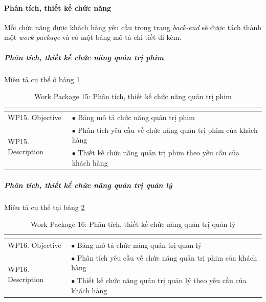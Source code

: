 \documentclass[a4paper]{book}
\begin{document}
\paragraph{Phân tích, thiết kế chức năng}
Mỗi chức năng được khách hàng yêu cầu trong trang \textit{back-end} sẽ được tách thành một \textit{work package} và có một bảng mô tả chi tiết đi kèm.
\subparagraph{Phân tích, thiết kế chức năng quản trị phim} Miêu tả cụ thể ở bảng \ref{table:backend_thietke_chucnang_phim}
\begin{table}[h!]
	\begin{center}
		\begin{tabular}{|p{4cm}|p{10cm}|}
			\hline
			\multicolumn{2}{|c|}{\cellcolor[HTML]{363636}{\color[HTML]{FFFFFF}Work package 15: Phân tích, thiết kế chức năng quản trị phim}}\\
			\hline
			\multirow{1}{*}{WP15. Objective} & $\bullet$ Bảng mô tả chức năng quản trị phim\\
			\hline
			\multirow{2}{*}{WP15. Description} & $\bullet$ Phân tích yêu cầu về chức năng quản trị phim của khách hàng \\
			& $\bullet$ Thiết kế chức năng quản trị phim theo yêu cầu của khách hàng\\
			\hline
		\end{tabular}
		\caption{Work Package 15: Phân tích, thiết kế chức năng quản trị phim}
		\label{table:backend_thietke_chucnang_phim}
	\end{center}
\end{table}
\subparagraph{Phân tích, thiết kế chức năng quản trị quản lý} Miêu tả cụ thể tại bảng \ref{table:backend_thietke_chucnang_quanly}
\begin{table}[h!]
	\begin{center}
		\begin{tabular}{|p{4cm}|p{10cm}|}
			\hline
			\multicolumn{2}{|c|}{\cellcolor[HTML]{363636}{\color[HTML]{FFFFFF}Work package 16: Phân tích, thiết kế chức năng quản trị quản lý}}\\
			\hline
			\multirow{1}{*}{WP16. Objective} & $\bullet$ Bảng mô tả chức năng quản trị quản lý\\
			\hline
			\multirow{2}{*}{WP16. Description} & $\bullet$ Phân tích yêu cầu về chức năng quản trị phim của khách hàng \\
			& $\bullet$ Thiết kế chức năng quản trị quản lý theo yêu cầu của khách hàng\\
			\hline
		\end{tabular}
		\caption{Work Package 16: Phân tích, thiết kế chức năng quản trị quản lý}
		\label{table:backend_thietke_chucnang_quanly}
	\end{center}
\end{table}
\end{document}
